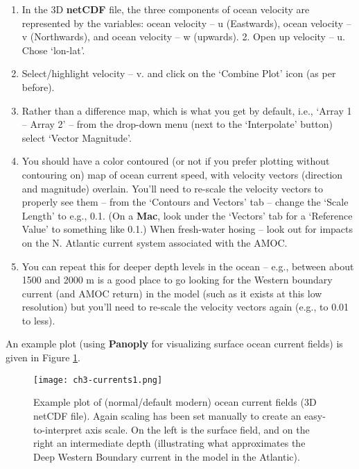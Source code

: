 \documentclass[11pt,fleqn]{book} %
\begin{document}
\vspace{1mm}
\begin{enumerate}[noitemsep]
\vspace{1mm}
\item  In the 3D \textbf{netCDF} file, the three components of ocean velocity are represented by the variables: ocean velocity – u (Eastwards), ocean velocity – v (Northwards), and ocean velocity – w (upwards). 2. Open up velocity – u. Chose ‘lon-lat’.
\vspace{1mm}
\item Select/highlight velocity – v. and click on the ‘Combine Plot’ icon (as per before).
\vspace{1mm}
\item Rather than a difference map, which is what you get by default, i.e., ‘Array 1 – Array 2’ – from the drop-down menu (next to the ‘Interpolate’ button) select ‘Vector Magnitude’.
\vspace{1mm}
\item You should have a color contoured (or not if you prefer plotting without contouring on) map of ocean current speed, with velocity vectors (direction and magnitude) overlain. You’ll need to re-scale the velocity vectors to properly see them – from the ‘Contours and Vectors’ tab – change the ‘Scale Length’ to e.g., 0.1. (On a \textbf{Mac}, look under the ‘Vectors’ tab for a ‘Reference Value’ to something like 0.1.)  When fresh-water hosing – look out for impacts on the N. Atlantic current system associated with the AMOC.
\vspace{1mm}
\item You can repeat this for deeper depth levels in the ocean – e.g., between about 1500 and 2000 m is a good place to go looking for the Western boundary current (and AMOC return) in the model (such as it exists at this low resolution) but you’ll need to re-scale the velocity vectors again (e.g., to 0.01 to less).
\end{enumerate}
\vspace{1mm}

\noindent An example plot (using \textbf{Panoply} for visualizing surface ocean current fields) is given in Figure \ref{fig:ch3-currents1}.

\begin{figure}
\texttt{[image: ch3-currents1.png]}\centering
\vspace{-0mm}
\caption{Example plot of (normal/default modern) ocean current fields (3D netCDF file). Again scaling has been set manually to create an easy-to-interpret axis scale. On the left is the surface field, and on the right an intermediate depth (illustrating what approximates the Deep Western Boundary current in the model in the Atlantic).}
\label{fig:ch3-currents1}
\end{figure}
\end{document}
